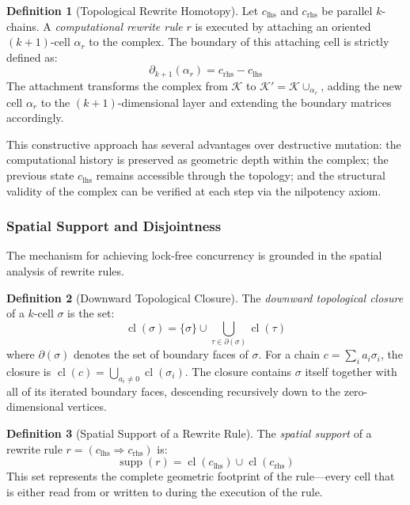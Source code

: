 \documentclass[manuscript, nonacm, review=false]{acmart}
\theoremstyle{definition}
\newtheorem{definition}{Definition}[section]
\theoremstyle{plain}
\newcommand{\K}{\mathcal{K}}
\newcommand{\supp}{\operatorname{supp}}
\newcommand{\cl}{\operatorname{cl}}
\begin{document}
\begin{definition}[Topological Rewrite Homotopy]
\label{def:rewrite}
Let $c_{\text{lhs}}$ and $c_{\text{rhs}}$ be parallel $k$-chains. A \emph{computational rewrite rule} $r$ is executed by attaching an oriented $(k+1)$-cell $\alpha_r$ to the complex. The boundary of this attaching cell is strictly defined as:
\begin{equation}
    \partial_{k+1}(\alpha_r) = c_{\text{rhs}} - c_{\text{lhs}}
    \label{eq:rewrite_boundary}
\end{equation}
The attachment transforms the complex from $\K$ to $\K' = \K \cup_{\alpha_r}$, adding the new cell $\alpha_r$ to the $(k+1)$-dimensional layer and extending the boundary matrices accordingly.
\end{definition}

This constructive approach has several advantages over destructive mutation: the computational history is preserved as geometric depth within the complex; the previous state $c_{\text{lhs}}$ remains accessible through the topology; and the structural validity of the complex can be verified at each step via the nilpotency axiom.


\subsubsection{Spatial Support and Disjointness}

The mechanism for achieving lock-free concurrency is grounded in the spatial analysis of rewrite rules.

\begin{definition}[Downward Topological Closure]
\label{def:closure}
The \emph{downward topological closure} of a $k$-cell $\sigma$ is the set:
\begin{equation}
    \cl(\sigma) = \{\sigma\} \cup \bigcup_{\tau \in \partial(\sigma)} \cl(\tau)
\end{equation}
where $\partial(\sigma)$ denotes the set of boundary faces of $\sigma$. For a chain $c = \sum_i a_i \sigma_i$, the closure is $\cl(c) = \bigcup_{a_i \neq 0} \cl(\sigma_i)$. The closure contains $\sigma$ itself together with all of its iterated boundary faces, descending recursively down to the zero-dimensional vertices.
\end{definition}

\begin{definition}[Spatial Support of a Rewrite Rule]
\label{def:support}
The \emph{spatial support} of a rewrite rule $r = (c_{\text{lhs}} \Rightarrow c_{\text{rhs}})$ is:
\begin{equation}
    \supp(r) = \cl(c_{\text{lhs}}) \cup \cl(c_{\text{rhs}})
    \label{eq:support}
\end{equation}
This set represents the complete geometric footprint of the rule---every cell that is either read from or written to during the execution of the rule.
\end{definition}
\end{document}
